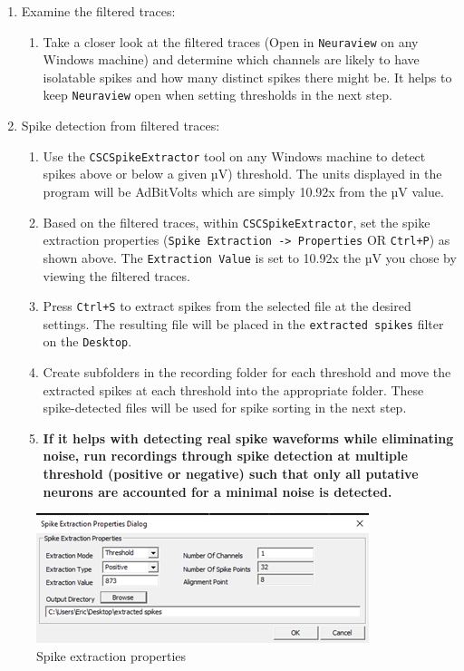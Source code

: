\documentclass[
]{book}
\providecommand{\tightlist}{%
  \setlength{\itemsep}{0pt}\setlength{\parskip}{0pt}}
\begin{document}
\begin{enumerate}
\def\labelenumi{\arabic{enumi}.}
\setcounter{enumi}{2}
\item
  Examine the filtered traces:

  \begin{enumerate}
  \def\labelenumii{\arabic{enumii}.}
  \tightlist
  \item
    Take a closer look at the filtered traces (Open in \texttt{Neuraview} on any
    Windows machine) and determine which channels are likely to have
    isolatable spikes and how many distinct spikes there might be. It helps
    to keep \texttt{Neuraview} open when setting thresholds in the next step.
  \end{enumerate}
\item
  Spike detection from filtered traces:

  \begin{enumerate}
  \def\labelenumii{\arabic{enumii}.}
  \item
    Use the \texttt{CSCSpikeExtractor} tool on any Windows machine to detect spikes
    above or below a given µV) threshold. The units displayed in the program
    will be AdBitVolts which are simply 10.92x from the µV value.
  \item
    Based on the filtered traces, within \texttt{CSCSpikeExtractor}, set the spike
    extraction properties (\texttt{Spike\ Extraction\ -\textgreater{}\ Properties} OR \texttt{Ctrl+P}) as
    shown above. The \texttt{Extraction\ Value} is set to 10.92x the µV you chose by
    viewing the filtered traces.
  \item
    Press \texttt{Ctrl+S} to extract spikes from the selected file at the desired
    settings. The resulting file will be placed in the \texttt{extracted\ spikes}
    filter on the \texttt{Desktop}.
  \item
    Create subfolders in the recording folder for each threshold and move
    the extracted spikes at each threshold into the appropriate folder.
    These spike-detected files will be used for spike sorting in the next
    step.
  \item
    \textbf{If it helps with detecting real spike waveforms while eliminating
    noise, run recordings through spike detection at multiple threshold
    (positive or negative) such that only all putative neurons are accounted
    for a minimal noise is detected.}
  \end{enumerate}
\end{enumerate}

\begin{figure}
\centering
\includegraphics{source_images/sec3.2.2_spike_extraction_properties.png}
\caption{Spike extraction
properties}
\end{figure}
\end{document}
